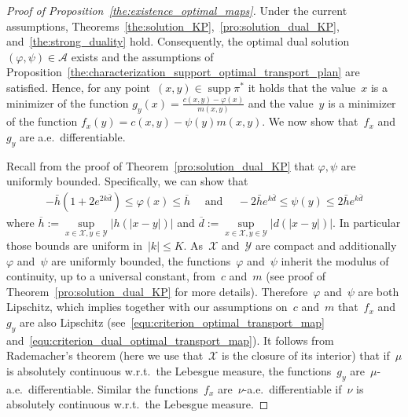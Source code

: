 \documentclass[10pt,a4paper]{amsart}
\DeclareMathOperator{\supp}{supp}
\begin{document}
\begin{proof}[Proof of Proposition~\ref{the:existence_optimal_maps}]
Under the current assumptions, Theorems~\ref{the:solution_KP},~\ref{pro:solution_dual_KP}, and~\ref{the:strong_duality} hold. Consequently, the optimal dual solution $(\varphi, \psi) \in \mathcal{A}$ exists and the assumptions of Proposition~\ref{the:characterization_support_optimal_transport_plan} are satisfied. 
Hence, for any point~$(x,y)\in \supp \pi^*$ it holds that the value~$x$ is a minimizer of the function $g_y(x) = \frac{c(x,y)- \varphi(x)}{m(x,y)}$ and the value~$y$ is a minimizer of the function $f_x(y) = c(x,y) -  \psi(y) m(x,y)$. We now show that~$f_x$ and~$g_y$ are a.e.~differentiable.\smallskip

Recall from the proof of Theorem~\ref{pro:solution_dual_KP} that $\varphi, \psi$ are uniformly bounded. Specifically, we can show that 
\begin{align}\label{equ:uniform_bounds_psi_phi}
-\bar{h}(1 + 2 e^{2k\bar{d}}) \leq \varphi (x) \leq \overline{h}  \quad \text{ and } \quad -2 \bar{h} e^{k \bar{d}}  \leq \psi(y) \leq 2 \bar{h} e^{k \bar{d}}    
\end{align} 
where $\overline{h} := \sup\limits_{x \in \mathcal{X}, y \in \mathcal{Y}} | h(|x - y|) |$ and $\overline{d} := \sup\limits_{x \in \mathcal{X}, y \in \mathcal{Y}} |d(|x - y|)|$. In particular those bounds are uniform in~$|k| \leq K$. As~$\mathcal{X}$ and~$\mathcal{Y}$ are compact and additionally~$\varphi$ and~$\psi$ are uniformly bounded, the functions~$\varphi$ and~$\psi$ inherit the modulus of continuity, up to a universal constant, from~$c$ and~$m$ (see proof of Theorem~\ref{pro:solution_dual_KP} for more details). Therefore~$\varphi$ and~$\psi$ are both Lipschitz, which implies together with our assumptions on~$c$ and~$m$ that~$f_x$ and~$g_y$ are also Lipschitz (see~\eqref{equ:criterion_optimal_transport_map} and~\eqref{equ:criterion_dual_optimal_transport_map}). It follows from Rademacher's theorem (here we use that~$\mathcal{X}$ is the closure of its interior) that if~$\mu$ is absolutely continuous w.r.t.~the Lebesgue measure, the functions~$g_y$ are~$\mu$-a.e.~differentiable. Similar the functions~$f_x$ are~$\nu$-a.e.~differentiable if~$\nu$ is absolutely continuous w.r.t.~the Lebesgue measure. \smallskip


\end{proof}
\end{document}
